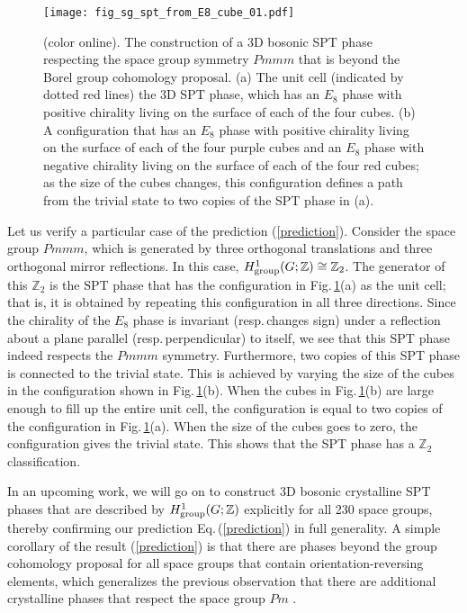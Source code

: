 \documentclass[sort&compress]{elsarticle}
\theoremstyle{theoremstyle}
\theoremstyle{framedtheoremstyle}
\theoremstyle{definitionstyle}
\theoremstyle{definitionstyle}
\theoremstyle{definitionstyle}
\theoremstyle{definitionstyle}
\theoremstyle{nameddefinitionstyle}
\theoremstyle{framednameddefinitionstyle}
\theoremstyle{proofstyle}
\theoremstyle{definitionstyle}
\newcommand{\ZZZ}{\mathbb{Z}}
\newcommand{\isomorphic}{\cong}
\begin{document}
\begin{figure}[t]
\centering
\texttt{[image: fig\_sg\_spt\_from\_E8\_cube\_01.pdf]}
\caption{(color online). The construction of a 3D bosonic SPT phase respecting the space group symmetry $Pmmm$ that is beyond the Borel group cohomology proposal. (a) The unit cell (indicated by dotted red lines) the 3D SPT phase, which has an $E_8$ phase with positive chirality living on the surface of each of the four cubes. (b) A configuration that has an $E_8$ phase with positive chirality living on the surface of each of the four purple cubes and an $E_8$ phase with negative chirality living on the surface of each of the four red cubes; as the size of the cubes changes, this configuration defines a path from the trivial state to two copies of the SPT phase in (a).}
\label{fig:3D_E8}
\end{figure}

Let us verify a particular case of the prediction (\ref{prediction}). Consider the space group $Pmmm$, which is generated by three orthogonal translations and three orthogonal mirror reflections. In this case, $H^1_{\rm group}(G;\ZZZ) \isomorphic \ZZZ_2$. The generator of this $\ZZZ_2$ is the SPT phase that has the configuration in Fig.\,\ref{fig:3D_E8}(a) as the unit cell; that is, it is obtained by repeating this configuration in all three directions. Since the chirality of the $E_8$ phase is invariant (resp.\,changes sign) under a reflection about a plane parallel (resp.\,perpendicular) to itself, we see that this SPT phase indeed respects the $Pmmm$ symmetry. Furthermore, two copies of this SPT phase is connected to the trivial state. This is achieved by varying the size of the cubes in the configuration shown in Fig.\,\ref{fig:3D_E8}(b). When the cubes in Fig.\,\ref{fig:3D_E8}(b) are large enough to fill up the entire unit cell, the configuration is equal to two copies of the configuration in Fig.\,\ref{fig:3D_E8}(a). When the size of the cubes goes to zero, the configuration gives the trivial state. This shows that the SPT phase has a $\ZZZ_2$ classification.

In an upcoming work, we will go on to construct 3D bosonic crystalline SPT phases that are described by $H^1_{\rm group}(G;\ZZZ)$ explicitly for all 230 space groups, thereby confirming our prediction Eq.\,(\ref{prediction}) in full generality. A simple corollary of the result (\ref{prediction}) is that there are phases beyond the group cohomology proposal \cite{Huang_dimensional_reduction} for all space groups that contain orientation-reversing elements, which generalizes the previous observation that there are additional crystalline phases that respect the space group $Pm$ \cite{Hermele_torsor}.
\end{document}
